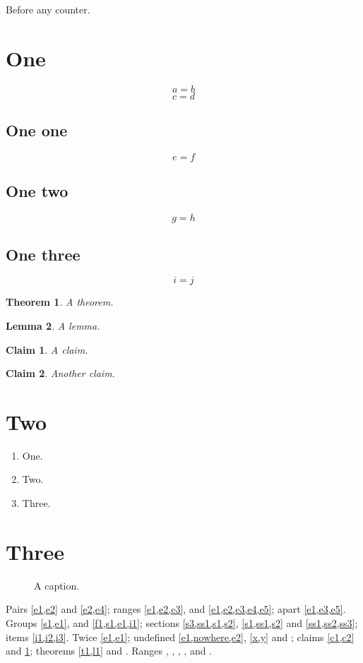 \documentclass{article}
\newtheorem{theorem}{Theorem}[section]
\newtheorem{lemma}[theorem]{Lemma}
\newtheorem{claim}{Claim}
\begin{document}
\label{top}Before any counter.

\section{One}\label{s1}
\begin{equation}\label{e1}
a = b
\end{equation}
\begin{equation}\label{e2}
c = d
\end{equation}
\subsection{One one}\label{ss1}
\begin{equation}\label{e3}
e = f
\end{equation}
\subsection{One two}\label{ss2}
\begin{equation}\label{e4}
g = h
\end{equation}
\subsection{One three}\label{ss3}
\begin{equation}\label{e5}
i = j
\end{equation}
\begin{theorem}\label{t1}
A theorem.
\end{theorem}
\begin{lemma}\label{l1}
A lemma.
\end{lemma}
\begin{claim}\label{c1}
A claim.
\end{claim}
\begin{claim}\label{c2}
Another claim.
\end{claim}
\section{Two}\label{s2}
\begin{enumerate}
\item One.\label{i1}
\item Two.\label{i2}
\item Three.\label{i3}
\end{enumerate}
\section{Three}\label{s3}
\begin{figure}[h]
\centering
\caption{A caption.}\label{f1}
\end{figure}
Pairs \cref{e1,e2} and \cref{e2,e4}; ranges \cref{e1,e2,e3},  and \cref{e1,e2,e3,e4,e5}; apart \cref{e1,e3,e5}.
Groups \cref{s1,e1},  and \cref{f1,s1,e1,i1}; sections \cref{s3,ss1,s1,s2}, \cref{s1,ss1,s2} and \cref{ss1,ss2,ss3}; items \cref{i1,i2,i3}.
Twice \cref{e1,e1}; undefined \cref{e1,nowhere,e2}, \cref{x,y} and ; claims \cref{c1,c2} and \cref{c1}; theorems \cref{t1,l1} and .
Ranges , , , ,  and .
\end{document}
